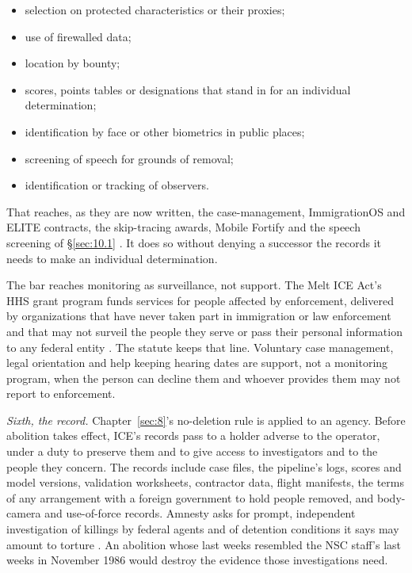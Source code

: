 \begin{itemize}
\item selection on protected characteristics or their proxies;
\item use of firewalled data;
\item location by bounty;
\item scores, points tables or designations that stand in for an individual determination;
\item identification by face or other biometrics in public places;
\item screening of speech for grounds of removal;
\item identification or tracking of observers.
\end{itemize}

That reaches, as they are now written, the case-management, ImmigrationOS and ELITE contracts, the skip-tracing awards, Mobile Fortify and the speech screening of \S\ref{sec:10.1} \autocite{Koebler2025ICM,Ho2025ImmigrationOS,Cox2026ELITE,Biddle2025BountyHunters,Cox2025MobileFortify,Caputo2025CatchRevoke}. It does so without denying a successor the records it needs to make an individual determination.

The bar reaches monitoring as surveillance, not support. The Melt ICE Act's HHS grant program funds services for people affected by enforcement, delivered by organizations that have never taken part in immigration or law enforcement and that may not surveil the people they serve or pass their personal information to any federal entity \autocite{hr7190}. The statute keeps that line. Voluntary case management, legal orientation and help keeping hearing dates are support, not a monitoring program, when the person can decline them and whoever provides them may not report to enforcement.

\emph{Sixth, the record.} Chapter~\ref{sec:8}'s no-deletion rule is applied to an agency. Before abolition takes effect, ICE's records pass to a holder adverse to the operator, under a duty to preserve them and to give access to investigators and to the people they concern. The records include case files, the pipeline's logs, scores and model versions, validation worksheets, contractor data, flight manifests, the terms of any arrangement with a foreign government to hold people removed, and body-camera and use-of-force records. Amnesty asks for prompt, independent investigation of killings by federal agents and of detention conditions it says may amount to torture \autocite{Amnesty2026Whistles}. An abolition whose last weeks resembled the NSC staff's last weeks in November 1986 would destroy the evidence those investigations need.

